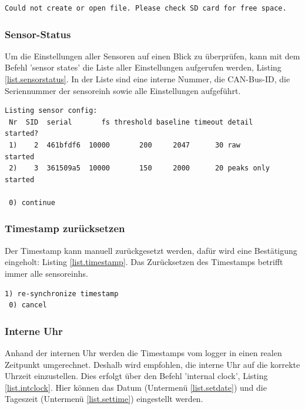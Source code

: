\begin{lstlisting}[caption=Fehlermeldung beim Starten eines Sensors, label=list.sensorerror]
Could not create or open file. Please check SD card for free space.
\end{lstlisting}

\subsubsection{Sensor-Status}\label{sssec.sensorstate}
Um die Einstellungen aller Sensoren auf einen Blick zu überprüfen, kann mit dem Befehl 'sensor states' die Liste aller Einstellungen aufgerufen werden, Listing \ref{list.sensorstatus}. In der Liste sind eine interne Nummer, die CAN-Bus-ID, die Seriennummer der \gls{sensoreinh} sowie alle Einstellungen aufgeführt.


\begin{lstlisting}[caption=Untermenü Sensor-Status, label=list.sensorstatus]
Listing sensor config:
 Nr  SID  serial       fs threshold baseline timeout detail     started?
 1)    2  461bfdf6  10000       200     2047      30 raw        started
 2)    3  361509a5  10000       150     2000      20 peaks only started
 
 0) continue
\end{lstlisting}


\subsubsection{Timestamp zurücksetzen}\label{sssec.timestamp}
Der Timestamp kann manuell zurückgesetzt werden, dafür wird eine Bestätigung eingeholt: Listing \ref{list.timestamp}. Das Zurücksetzen des Timestamps betrifft immer alle \glspl{sensoreinh}.

\begin{lstlisting}[caption=Untermenü Timestamp zurücksetzen, label=list.timestamp]
 1) re-synchronize timestamp
 0) cancel
\end{lstlisting}


\subsubsection{Interne Uhr}\label{sssec.intclock}
Anhand der internen Uhr werden die Timestamps vom \gls{logger} in einen realen Zeitpunkt umgerechnet. Deshalb wird empfohlen, die interne Uhr auf die korrekte Uhrzeit einzustellen. Dies erfolgt über den Befehl 'internal clock', Listing \ref{list.intclock}. Hier können das Datum (Untermenü \ref{list.setdate}) und die Tageszeit (Untermenü \ref{list.settime}) eingestellt werden.

